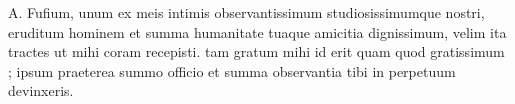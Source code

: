


A. Fufium, unum ex meis intimis observantissimum studiosissimumque nostri, eruditum hominem et summa
humanitate tuaque amicitia dignissimum, velim ita tractes
ut mihi coram recepisti. tam gratum mihi id erit quam quod gratissimum ; ipsum praeterea summo officio et summa observantia tibi in perpetuum devinxeris.
